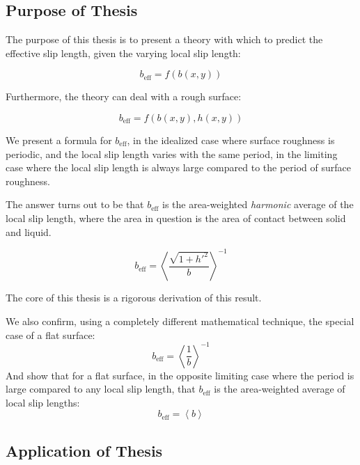 \documentclass[a4paper]{report}
\newcommand{\beff}{\ensuremath{b_{\mathrm{eff}}}}
\begin{document}
\vspace{1em}

\subsection*{Purpose of Thesis}

The purpose of this thesis is to present a theory with which to predict the effective slip length, given the varying local slip length:

\begin{equation}
b_{\mathrm{eff}} = f(b(x,y))
\end{equation}

Furthermore, the theory can deal with a rough surface:

\begin{equation}
\beff = f(b(x,y),h(x,y))
\end{equation}

We present a formula for $\beff$, in the idealized case where surface roughness is periodic, and the local slip length varies with the same period, in the limiting case where the local slip length is always large compared to the period of surface roughness.

The answer turns out to be that $\beff$ is the area-weighted \emph{harmonic} average of the local slip length, where the area in question is the area of contact between solid and liquid.


\begin{equation}
\beff = \left< \frac{\sqrt{1+h'^{2}}}{b}  \right > ^{-1}
\end{equation}

The core of this thesis is a rigorous derivation of this result.

\vspace*{1em}
We also confirm, using a completely different mathematical technique, the special case of a flat surface:
\begin{equation}
\beff = \left< \frac{1}{b}  \right > ^{-1}
\end{equation}
And show that for a flat surface, in the opposite limiting case where the period is large compared to any local slip length, that $\beff$ is the area-weighted average of local slip lengths:
\begin{equation}
\beff = \left< b  \right >
\end{equation}


\subsection*{Application of Thesis}
\end{document}
